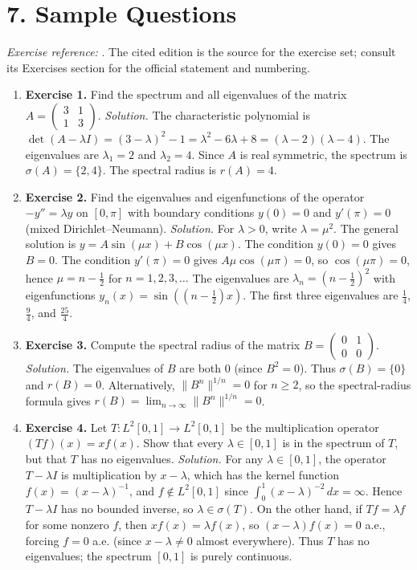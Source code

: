 \section*{7. Sample Questions}
\emph{Exercise reference:} \cite{spectral_ref1}. The cited edition is the source for the exercise set; consult its Exercises section for the official statement and numbering.
\begin{enumerate}[leftmargin=*,itemsep=0.9em]
\item \textbf{Exercise 1.} Find the spectrum and all eigenvalues of the matrix $A = \begin{pmatrix} 3 & 1 \\ 1 & 3 \end{pmatrix}$. \emph{Solution.} The characteristic polynomial is $\det(A - \lambda I) = (3-\lambda)^2 - 1 = \lambda^2 - 6\lambda + 8 = (\lambda - 2)(\lambda - 4)$. The eigenvalues are $\lambda_1 = 2$ and $\lambda_2 = 4$. Since $A$ is real symmetric, the spectrum is $\sigma(A) = \{2, 4\}$. The spectral radius is $r(A) = 4$.

\item \textbf{Exercise 2.} Find the eigenvalues and eigenfunctions of the operator $-y'' = \lambda y$ on $[0, \pi]$ with boundary conditions $y(0) = 0$ and $y'(\pi) = 0$ (mixed Dirichlet--Neumann). \emph{Solution.} For $\lambda > 0$, write $\lambda = \mu^2$. The general solution is $y = A\sin(\mu x) + B\cos(\mu x)$. The condition $y(0) = 0$ gives $B = 0$. The condition $y'(\pi) = 0$ gives $A\mu\cos(\mu\pi) = 0$, so $\cos(\mu\pi) = 0$, hence $\mu = n - \frac{1}{2}$ for $n = 1, 2, 3, \ldots$ The eigenvalues are $\lambda_n = (n - \frac{1}{2})^2$ with eigenfunctions $y_n(x) = \sin\!\left((n - \frac{1}{2})x\right)$. The first three eigenvalues are $\frac{1}{4}$, $\frac{9}{4}$, and $\frac{25}{4}$.

\item \textbf{Exercise 3.} Compute the spectral radius of the matrix $B = \begin{pmatrix} 0 & 1 \\ 0 & 0 \end{pmatrix}$. \emph{Solution.} The eigenvalues of $B$ are both $0$ (since $B^2 = 0$). Thus $\sigma(B) = \{0\}$ and $r(B) = 0$. Alternatively, $\|B^n\|^{1/n} = 0$ for $n \geq 2$, so the spectral-radius formula gives $r(B) = \lim_{n \to \infty} \|B^n\|^{1/n} = 0$.

\item \textbf{Exercise 4.} Let $T\colon L^2[0,1] \to L^2[0,1]$ be the multiplication operator $(Tf)(x) = xf(x)$. Show that every $\lambda \in [0,1]$ is in the spectrum of $T$, but that $T$ has no eigenvalues. \emph{Solution.} For any $\lambda \in [0,1]$, the operator $T - \lambda I$ is multiplication by $x - \lambda$, which has the kernel function $f(x) = (x - \lambda)^{-1}$, and $f \notin L^2[0,1]$ since $\int_0^1 (x-\lambda)^{-2}\,dx = \infty$. Hence $T - \lambda I$ has no bounded inverse, so $\lambda \in \sigma(T)$. On the other hand, if $Tf = \lambda f$ for some nonzero $f$, then $xf(x) = \lambda f(x)$, so $(x - \lambda)f(x) = 0$ a.e., forcing $f = 0$ a.e. (since $x - \lambda \neq 0$ almost everywhere). Thus $T$ has no eigenvalues; the spectrum $[0,1]$ is purely continuous.


\end{enumerate}
